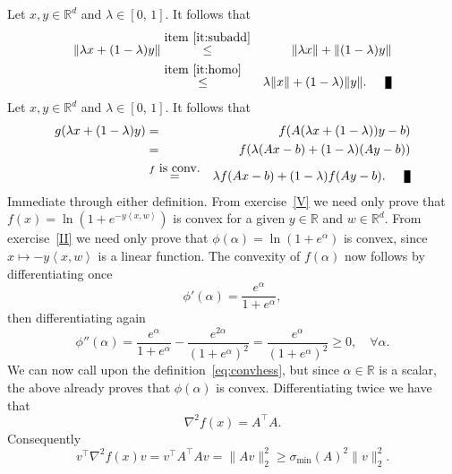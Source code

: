 \documentclass[11pt]{article}
\newcommand{\R}{\mathbb{R}}
\newcommand{\qed}{\nobreak \ifvmode \relax \else
      \ifdim\lastskip<1.5em \hskip-\lastskip
      \hskip1.5em plus0em minus0.5em \fi \nobreak
      \vrule height0.75em width0.5em depth0.25em\fi}
\newcommand{\norm}[1]{\lVert#1\rVert}
\newcommand{\dotprod}[1]{\left< #1\right>}
\begin{document}
\begin{ExerciseList}
   \Answer[ref={I}]
   Let $x,y \in \R^d$ and $\lambda \in [0,\, 1]$. It follows that
   \begin{eqnarray}
   \norm{\lambda x + (1-\lambda)y}  &\overset{\mbox{item}~\ref{it:subadd}}{\leq} &
   \norm{\lambda x} + \norm{(1-\lambda)y}\nonumber \\
    &\overset{\mbox{item}~\ref{it:homo}}{\leq} &   \lambda\norm{ x} + (1-\lambda)\norm{y}. \qed \nonumber
   \end{eqnarray}
   \Answer[ref={II}]    Let $x,y \in \R^d$ and $\lambda \in [0,\, 1]$. It follows that 
      \begin{eqnarray}
   g(\lambda x + (1-\lambda)y) & =&  f( A(\lambda x + (1-\lambda))y-b)\nonumber\\
   & =&  f( \lambda (A x-b) + (1-\lambda)(Ay-b)) \\
   & \overset{f \mbox{ is conv.}}{=}&  \lambda f(Ax-b) + (1-\lambda)f(Ay-b). \qed \nonumber
   \end{eqnarray}
     \Answer[ref={V}] Immediate through either definition.
    \Answer[ref={III}] From exercise~\ref{V} we need only prove  
 that $f(x) = \ln(1+e^{-y \dotprod{x,w}})$ is convex for a given $y \in \R$ and $w \in \R^d.$ From exercise~\ref{II} we need only prove that $\phi(\alpha) = \ln(1+e^{\alpha})$ is convex, since $x \mapsto -y \dotprod{x,w} $ is a linear function.  The convexity of $f(\alpha)$ now follows by differentiating once
\[\phi'(\alpha) = \frac{e^{\alpha}}{1+e^{\alpha}},\] 
 then differentiating again
\begin{equation}\label{eq:logistichess}
\phi''(\alpha) = \frac{e^{\alpha}}{1+e^{\alpha}}-\frac{e^{2\alpha}}{(1+e^{\alpha})^2}= \frac{e^{\alpha}}{(1+e^{\alpha})^2} \geq 0, 	\quad \forall \alpha.\end{equation}
 We can now call upon the definition~\eqref{eq:convhess}, but since $\alpha \in \R$ is a scalar, the above already proves that $\phi(\alpha)$ is convex.
     \Answer[ref={IV}]   Differentiating twice we have that 
     \[\nabla^2 f(x) = A^\top A.\]
     Consequently 
     \[v^\top \nabla^2 f(x)v = v^\top A^\top A v = \norm{Av}_2^2 \geq \sigma_{\min}(A)^2 \norm{v}_2^2.\]
\end{ExerciseList}
\end{document}
